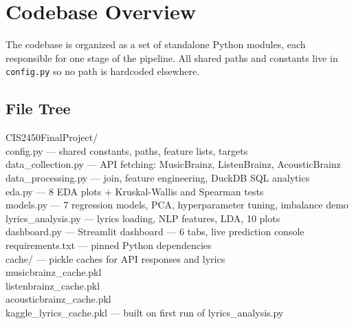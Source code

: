 \documentclass[11pt, letterpaper]{article}
\newcommand{\fdesc}[1]{\small\color{mutedgray} — #1}
\begin{document}
\section{Codebase Overview}

The codebase is organized as a set of standalone Python modules, each
responsible for one stage of the pipeline. All shared paths and constants live
in \texttt{config.py} so no path is hardcoded elsewhere.

\subsection{File Tree}

\begin{mdframed}[backgroundcolor=lightgray, linewidth=0pt,
                 innerleftmargin=12pt, innertopmargin=8pt, innerbottommargin=8pt]
\begin{small}\ttfamily
CIS2450FinalProject/\\
\quad config.py \fdesc{shared constants, paths, feature lists, targets}\\
\quad data\_collection.py \fdesc{API fetching: MusicBrainz, ListenBrainz, AcousticBrainz}\\
\quad data\_processing.py \fdesc{join, feature engineering, DuckDB SQL analytics}\\
\quad eda.py \fdesc{8 EDA plots + Kruskal-Wallis and Spearman tests}\\
\quad models.py \fdesc{7 regression models, PCA, hyperparameter tuning, imbalance demo}\\
\quad lyrics\_analysis.py \fdesc{lyrics loading, NLP features, LDA, 10 plots}\\
\quad dashboard.py \fdesc{Streamlit dashboard — 6 tabs, live prediction console}\\
\quad requirements.txt \fdesc{pinned Python dependencies}\\[0.4em]
\quad cache/ \fdesc{pickle caches for API responses and lyrics}\\
\quad\quad musicbrainz\_cache.pkl\\
\quad\quad listenbrainz\_cache.pkl\\
\quad\quad acousticbrainz\_cache.pkl\\
\quad\quad kaggle\_lyrics\_cache.pkl \fdesc{built on first run of lyrics\_analysis.py}\\[0.4em]

\end{small}
\end{mdframed}
\end{document}
